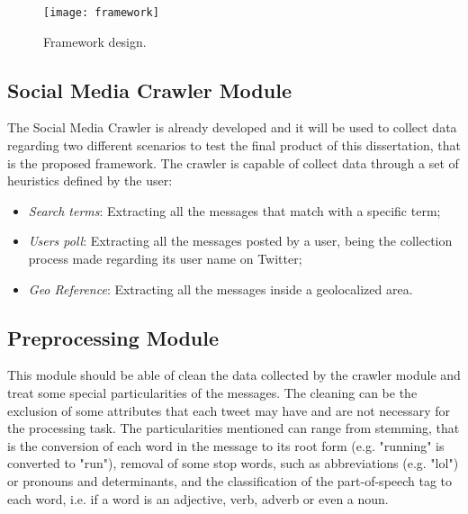 \begin{figure}
  \centering
    \texttt{[image: framework]}
    \caption{Framework design.}
    \label{fig:framework}
\end{figure}

\subsection{Social Media Crawler Module}

The Social Media Crawler is already developed and it will be used to collect data regarding two different scenarios to test the final product of this dissertation, that is the proposed framework. The crawler is capable of collect data through a set of heuristics defined by the user:

\begin{itemize}
\item \textit{Search terms}: Extracting all the messages that match with a specific term;
\item \textit{Users poll}: Extracting all the messages posted by a user, being the collection process made regarding its user name on Twitter;
\item \textit{Geo Reference}: Extracting all the messages inside a geolocalized area.
\end{itemize}

\subsection{Preprocessing Module}

This module should be able of clean the data collected by the crawler module and treat some special particularities of the messages. The cleaning can be the exclusion of some attributes that each tweet may have and are not necessary for the processing task. The particularities mentioned can range from stemming, that is the conversion of each word in the message to its root form (e.g. "running" is converted to "run"), removal of some stop words, such as abbreviations (e.g. "lol") or pronouns and determinants, and the classification of the part-of-speech tag to each word, i.e. if a word is an adjective, verb, adverb or even a noun.

